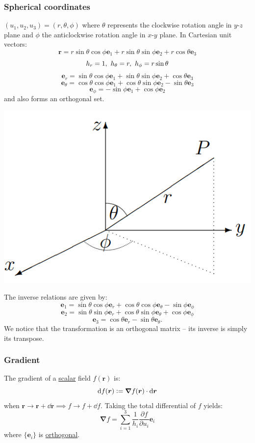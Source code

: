 \documentclass{article}
\newcommand{\deq}{\vcentcolon=}
\newcommand{\vc}[1]{\boldsymbol{#1}}
\begin{document}
\begin{multicols*}{3}
\subsubsection*{Spherical coordinates}
$(u_1,u_2,u_3)=(r,\theta,\phi)$ where
$\theta$ represents the clockwise
rotation angle in $y$-$z$ plane
and $\phi$ the anticlockwise
rotation angle in $x$-$y$ plane.
In Cartesian unit vectors:
$$\vc{r}=r\sin\theta\cos\phi\vc{e}_1
+r\sin\theta\sin\phi\vc{e}_2
+r\cos\theta\vc{e}_3$$
$$h_{r}=1,\hspace{0.05in} h_{\theta}=r,
\hspace{0.05in} h_{\phi}=r\sin\theta$$
$$\vc{e}_{r}=\sin\theta\cos\phi\vc{e}_1
+\sin\theta\sin\phi\vc{e}_2+\cos\theta\vc{e}_3$$
$$\vc{e}_{\theta}=\cos\theta\cos\phi\vc{e}_1
+\cos\theta\sin\phi\vc{e}_2-\sin\theta\vc{e}_3$$
$$\vc{e}_{\phi}=-\sin\phi\vc{e}_1+\cos\phi\vc{e}_2$$
and also forms an orthogonal set.
\begin{center}
    \includegraphics[scale=0.3]{f00.png}
\end{center}
The inverse relations are given by:
$$\vc{e}_1=\sin\theta\cos\phi\vc{e}_r
+\cos\theta\cos\phi\vc{e}_{\theta}-\sin\phi\vc{e}_{\phi}$$
$$\vc{e}_2=\sin\theta\sin\phi\vc{e}_r+\cos\theta\sin\phi
\vc{e}_{\theta}+\cos\phi\vc{e}_{\phi}$$
$$\vc{e}_3=\cos\theta\vc{e}_r-\sin\theta\vc{e}_{\theta}.$$
We notice that the transformation is an orthogonal matrix --
its inverse is simply its transpose.

\subsubsection*{Gradient}
The gradient of a \underline{scalar} field
$f(\vc{r})$ is:
$$\dd f(\vc{r})\deq\vc{\nabla}f(\vc{r})\cdot\dd\vc{r}$$
when $\vc{r}\rightarrow\vc{r}+\dd\vc{r}
\implies f\rightarrow f+\dd f$.
Taking the total differential of $f$ yields:
$$\vc{\nabla}f=\sum_{i=1}^{3}\frac{1}{h_i}
\frac{\partial f}{\partial u_i}\vc{e}_i$$
where $\{\vc{e}_i\}$ is \underline{orthogonal}.


\end{multicols*}
\end{document}
